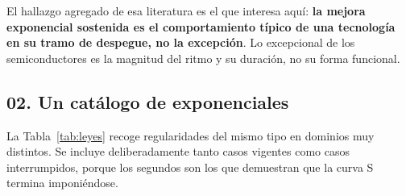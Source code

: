 \documentclass[11pt,letterpaper]{article}
\begin{document}
El hallazgo agregado de esa literatura es el que interesa aquí: \textbf{la mejora
exponencial sostenida es el comportamiento típico de una tecnología en su tramo
de despegue, no la excepción}. Lo excepcional de los semiconductores es la
magnitud del ritmo y su duración, no su forma funcional.

\subsection*{02. Un catálogo de exponenciales}

La Tabla~\ref{tab:leyes} recoge regularidades del mismo tipo en dominios muy
distintos. Se incluye deliberadamente tanto casos vigentes como casos
interrumpidos, porque los segundos son los que demuestran que la curva S termina
imponiéndose.
\end{document}
